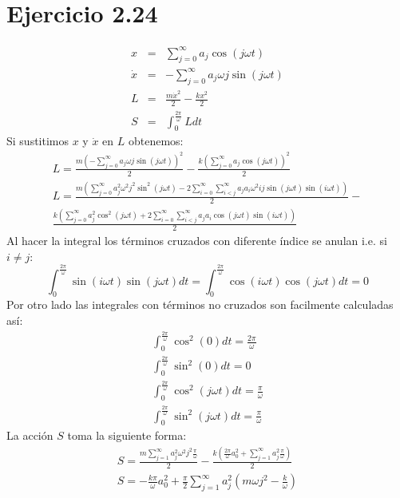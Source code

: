 \documentclass[letterpaper,10pt]{article}
\begin{document}
\section*{Ejercicio 2.24}
\begin{eqnarray}
\label{ecu}
 x&=&\sum_{j=0}^\infty a_j \cos(j \omega t)\\
\dot x&=&-\sum_{j=0}^\infty a_j \omega j \sin(j \omega t)\\
L&=&\frac{m \dot x^2}{2}-\frac{k x^2}{2}\\
S&=&\int_{0}^{\frac{2 \pi}{\omega}} L dt
\end{eqnarray}
Si sustitimos $x$ y $\dot x$ en $L$ obtenemos:
\begin{eqnarray}
L=\frac{m (-\sum_{j=0}^\infty a_j \omega j \sin(j \omega t))^2}{2}-\frac{k (\sum_{j=0}^\infty a_j \cos(j \omega t))^2}{2}\\
L=\frac{m( \sum_{j=0}^\infty a_j^2 \omega^2 j^2 \sin^2(j \omega t)- 2\sum_{i=0}^{\infty}\sum_{i<j}^\infty a_j a_i \omega^2 i j \sin(j \omega t) \sin(i \omega t) )}{2}-\\
\frac{k( \sum_{j=0}^\infty a_j^2 \cos^2(j \omega t)+ 2\sum_{i=0}^{\infty}\sum_{i<j}^\infty a_j a_i \cos(j \omega t) \sin(i \omega t) )}{2}
\end{eqnarray}
Al hacer la integral los t\'erminos cruzados con diferente \'indice se anulan i.e. si  $i\neq j$:
\begin{equation}
\int_{0}^{\frac{2 \pi}{\omega}} \sin(i \omega t) \sin(j \omega t) dt=\int_{0}^{\frac{2 \pi}{\omega}} \cos(i \omega t) \cos(j \omega t) dt=0 
\end{equation}
Por otro lado las integrales con t\'erminos no cruzados son facilmente calculadas as\'i:
\begin{eqnarray}
 \int_{0}^{\frac{2 \pi}{\omega}} \cos^2(0)dt=\frac{2 \pi}{\omega}\\
\int_{0}^{\frac{2 \pi}{\omega}} \sin^2(0)dt=0\\
\int_{0}^{\frac{2 \pi}{\omega}} \cos^2(j \omega t)dt=\frac{\pi}{\omega}\\
\int_{0}^{\frac{2 \pi}{\omega}} \sin^2(j \omega t)dt=\frac{\pi}{\omega}
\end{eqnarray}
La acci\'on $S$ toma la siguiente forma:
\begin{eqnarray}
 S=\frac{m\sum_{j=1}^\infty a_j^2 \omega^2 j^2 \frac{\pi}{\omega}}{2}-\frac{k( \frac{2\pi}{\omega}a_0^2+\sum_{j=1}^\infty a_j^2 \frac{\pi}{\omega})}{2}\\
S=-\frac{k\pi}{\omega}a_0^2+\frac{\pi}{2} \sum_{j=1}^\infty a_j^2(m \omega j^2-\frac{k}{\omega})
\end{eqnarray}
\end{document}
